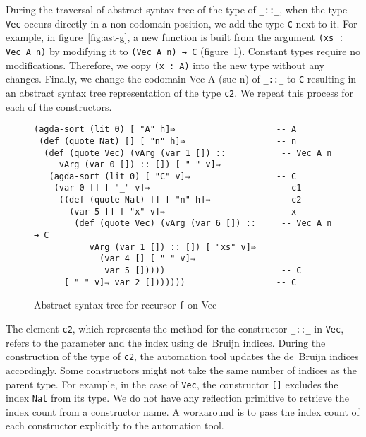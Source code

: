 \documentclass[sigplan,10pt]{acmart}
\begin{document}
During the traversal of abstract syntax tree of the type of {\tt \_::\_}, when the type {\tt Vec} occurs directly in a non-codomain position, we add the type {\tt C} next to it. For example, in figure~\ref{fig:ast-g}, a new function is built from the argument {\tt (xs : Vec A n)} by modifying it to {\tt (Vec A n) → C} (figure~\ref{fig:ast-d}). Constant types require no modifications. Therefore, we copy {\tt (x : A)} into the new type without any changes. Finally, we change the codomain {Vec A (suc n)} of {\tt \_::\_} to \texttt{C} resulting in an abstract syntax tree representation of the type {\tt c2}. We repeat this process for each of the constructors.

\begin{figure}
\begin{center}
\begingroup
\fontsize{7pt}{9pt}\selectfont
\begin{Verbatim}
(agda-sort (lit 0) [ "A" h]⇒                    -- A
 (def (quote Nat) [] [ "n" h]⇒                  -- n
  (def (quote Vec) (vArg (var 1 []) ::           -- Vec A n
     vArg (var 0 []) :: []) [ "_" v]⇒
   (agda-sort (lit 0) [ "C" v]⇒                 -- C
    (var 0 [] [ "_" v]⇒                         -- c1
     ((def (quote Nat) [] [ "n" h]⇒             -- c2
       (var 5 [] [ "x" v]⇒                      -- x
        (def (quote Vec) (vArg (var 6 []) ::     -- Vec A n → C
           vArg (var 1 []) :: []) [ "xs" v]⇒  
             (var 4 [] [ "_" v]⇒ 
              var 5 []))))                       -- C
      [ "_" v]⇒ var 2 []))))))                  -- C
\end{Verbatim}
\endgroup
\end{center}
\caption{Abstract syntax tree for recursor {\tt f} on Vec}
\label{fig:ast-d}
\end{figure}
\normalsize

The element {\tt c2}, which represents the method for the constructor {\tt \_::\_} in {\tt Vec}, refers to the parameter and the index using de~Bruijn indices. During the construction of the type of {\tt c2}, the automation tool updates the de~Bruijn indices accordingly. Some constructors might not take the same number of indices as the parent type. For example, in the case of {\tt Vec}, the constructor {\tt []} excludes the index {\tt Nat} from its type. We do not have any reflection primitive to retrieve the index count from a constructor name. A workaround is to pass the index count of each constructor explicitly to the automation tool.
\end{document}
